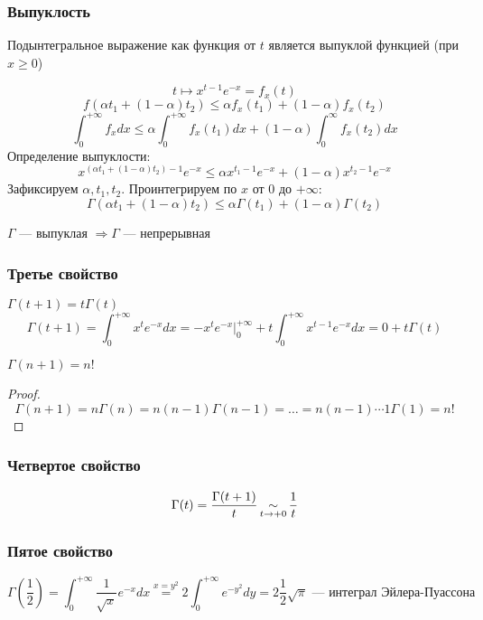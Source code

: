 \subsubsection*{Выпуклость}

Подынтегральное выражение как функция от $t$ является выпуклой функцией (при $x\geq 0$)

$$t\mapsto x^{t-1} e^{-x} = f_x(t)$$
$$f(\alpha t_1 + (1-\alpha)t_2)\leq \alpha f_x(t_1) + (1-\alpha)f_x(t_2)$$
$$\int_0^{+\infty} f_x dx \leq \alpha \int_0^{+\infty} f_x(t_1)dx + (1-\alpha) \int_0^{\infty} f_x(t_2) dx$$
Определение выпуклости: $$x^{(\alpha t_1 + (1-\alpha)t_2)-1}e^{-x}\leq \alpha x^{t_1-1}e^{-x}+(1-\alpha)x^{t_2-1}e^{-x}$$
Зафиксируем $\alpha, t_1, t_2$. Проинтегрируем по $x$ от $0$ до $+\infty$:
$$\Gamma(\alpha t_1 + (1-\alpha)t_2)\leq \alpha\Gamma(t_1) + (1-\alpha)\Gamma(t_2)$$

$\Gamma$ --- выпуклая $\Rightarrow \Gamma$ --- непрерывная

\subsubsection*{Третье свойство}

$\Gamma(t+1)=t\Gamma(t)$
$$\Gamma(t+1)=\int_0^{+\infty} x^t e^{-x}dx = -x^t e^{-x}\Bigg|_0^{+\infty} + t\int_0^{+\infty} x^{t-1}e^{-x} dx=0+t\Gamma(t)$$

\begin{consequence}
    $\Gamma(n+1)=n!$
\end{consequence}
\begin{proof}
    $$\Gamma(n+1)=n\Gamma(n)=n(n-1)\Gamma(n-1)=\ldots = n(n-1)\cdots 1 \Gamma(1)=n!$$
\end{proof}

\subsubsection*{Четвертое свойство}

$$\Gamma(t) = \frac{\Gamma(t+1)}{t}\operatorname*{\sim}_{t\to+0}\frac{1}{t}$$

\subsubsection*{Пятое свойство}

$$\Gamma\left(\frac{1}{2}\right)=\int_0^{+\infty} \frac{1}{\sqrt x} e^{-x} dx \stackrel{x=y^2}{=}2\int_0^{+\infty} e^{-y^2}dy=2\frac{1}{2}\sqrt\pi \text{ --- интеграл Эйлера-Пуассона}$$

